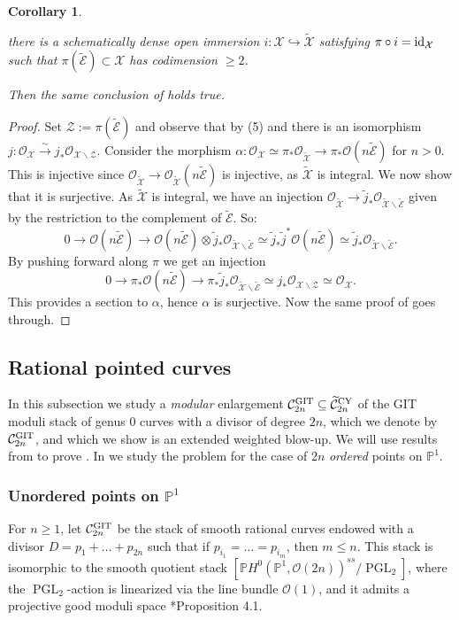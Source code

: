 \documentclass{amsart}
\newcommand{\bP}{\mathbb{P}}
\newcommand{\cC}{\mathcal{C}}
\newcommand{\cE}{\mathcal{E}}
\newcommand{\cO}{\mathcal{O}}
\newcommand{\cX}{\mathcal{X}}
\newcommand{\cZ}{\mathcal{Z}}
\newcommand{\PGL}{\operatorname{PGL}}
\newcommand{\id}{\rm{id}}
\newcommand{\git}{{\rm GIT}}
\newcommand{\CY}{{\rm CY}}
\newtheorem{Cor}[theorem]{Corollary}
\theoremstyle{definition}
\theoremstyle{definition}
\begin{document}
{\begin{Cor}
\begin{itemize}
       there is a schematically dense open immersion $i:\cX\hookrightarrow \widetilde{\cX}$ satisfying $\pi\circ i = \id_{\cX}$ such that $\pi(\widetilde{\cE})\subset \cX$ has codimension $\geq 2$.
    \end{itemize}
    Then the same conclusion of  holds true.
\end{Cor}
\begin{proof}
    Set $\cZ:=\pi(\widetilde{\cE})$ and observe that by (5) and  there is an isomorphism $j:\cO_{\cX} \overset{\sim}{\to} j_*\cO_{\cX\smallsetminus\cZ}$. Consider the morphism $\alpha\colon\cO_{\cX}\simeq \pi_*\cO_{\widetilde{\cX}} \to \pi_*\cO(n\widetilde{\cE})$ for $n>0$. This is injective since $\cO_{\widetilde{\cX}}\to \cO_{\widetilde{\cX}}(n\widetilde{\cE})$ is injective, as $\widetilde{\cX}$ is integral. We now show that it is surjective.
    As $\widetilde{\cX}$ is integral, we have an injection $ \cO_{\widetilde{\cX}}\to \widetilde{j}_*\cO_{\widetilde{\cX}\smallsetminus \widetilde{\cE}}$ given by the restriction to the complement of $\widetilde{\cE}$. So:
    \[0\longrightarrow\cO(n\widetilde{\cE}) \longrightarrow \cO(n\widetilde{\cE})\otimes \widetilde{j}_*\cO_{\widetilde{\cX}\smallsetminus\widetilde{\cE}} \simeq \widetilde{j}_*\widetilde{j}^*\cO(n\widetilde{\cE}) \simeq \widetilde{j}_*\cO_{\widetilde{\cX}\smallsetminus \widetilde{\cE}}.\] 
    By pushing forward along $\pi$ we get an injection 
    \[0 \longrightarrow \pi_*\cO(n\widetilde{\cE}) \longrightarrow \pi_*\widetilde{j}_*\cO_{\widetilde{\cX}\smallsetminus\widetilde{\cE}} \simeq j_*\cO_{\cX\smallsetminus\cZ} \simeq \cO_{\cX}.\]
    This provides a section to $\alpha$, hence $\alpha$ is surjective. Now the same proof of  goes through.
\end{proof}
\subsection{Rational pointed curves}\label{subsection_pts_on_p1}

In this subsection we study a \textit{modular} enlargement $\cC^\git_{2n} \subseteq \widetilde{\cC}^{\CY}_{2n}$ of the GIT moduli stack of genus 0 curves with a divisor of degree $2n$, which we denote by $\cC^\git_{2n}$, and which we show is an extended weighted blow-up.  We will use results from  to prove . In  we study the problem for the case of $2n$ \textit{ordered} points on $\bP^1$.
\subsubsection{Unordered points on $\bP^1$}
For $n\geq 1$, let $\cC_{2n}^{\git}$ be the stack of smooth rational curves endowed with a divisor $D=p_1+\ldots+p_{2n}$ such that if $p_{i_1}=\ldots=p_{i_m}$, then $m\leq n$. This stack is isomorphic to the smooth quotient stack $[\bP H^0(\bP^1,\cO(2n))^{ss}/\PGL_2]$, where the $\PGL_2$-action is linearized via the line bundle $\cO(1)$, and it admits a projective good moduli space \cite{MFK}*{Proposition 4.1}.

}
\end{document}
